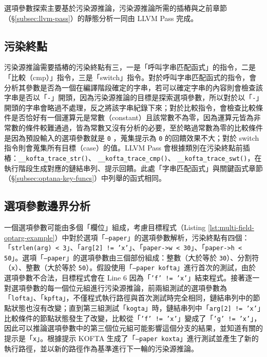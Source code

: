 選項參數探索主要基於污染源推論，污染源推論所需的插樁與之前章節（\S \ref{subsec:llvm-pass}）的靜態分析一同由 LLVM Pass 完成。

\subsection{污染終點}

污染源推論需要插樁的污染終點有三，一是「呼叫字串匹配函式」的指令，二是「比較（cmp）」指令，三是「switch」指令。對於呼叫字串匹配函式的指令，會分析其參數是否為一個在編譯階段確定的字串，若可以確定字串的內容則會檢查該字串是否以「\texttt{-}」開頭，因為污染源推論的目標是探索選項參數，所以對於以「\texttt{-}」開頭的字串會略過不處理，反之將該字串紀錄下來；對於比較指令，會檢查比較條件是否恰好有一個運算元是常數（constant）且該常數不為零，因為運算元皆為非常數的條件較難通過，皆為常數又沒有分析的必要，至於略過常數為零的比較條件是因為預設輸入的選項參數就是 \texttt{0} ，蒐集提示為 \texttt{0} 的回饋效果不大；對於 switch 指令則會蒐集所有目標（case）的值。LLVM Pass 會根據類別在污染終點前插樁：\texttt{\_\_kofta\_trace\_str()}、 \texttt{\_\_kofta\_trace\_cmp()}、  \texttt{\_\_kofta\_trace\_swt()}，在執行階段生成對應的鏈結串列、提示回饋。此處「字串匹配函式」與關鍵函式章節（\S \ref{subsec:optana-key-funcs}）中列舉的函式相同。

\subsection{選項參數邊界分析}

一個選項參數可能由多個「欄位」組成，考慮目標程式（Listing \ref{lst:multi-field-optarg-example}）中對於選項「\texttt{--paper}」的選項參數解析，污染終點有四個：「\texttt{strlen(arg) < 3}」、「\texttt{arg[2] != 'x'}」、「\texttt{paper->w < 30}」、「\texttt{paper->h < 50}」。選項「\texttt{--paper}」的選項參數由三個部份組成：整數（大於等於 \texttt{30}）、分割符（\texttt{x}）、整數（大於等於 \texttt{50}）。假設使用「\texttt{--paper kofta}」進行首次的測試，由於選項參數不合法，目標程式會在 Line 6 因為「\texttt{'f' != 'x'}」結束程式。接著逐一對選項參數的每一個位元組進行污染源推論，前兩組測試的選項參數為「\texttt{lofta}」、「\texttt{kpfta}」，不僅程式執行路徑與首次測試時完全相同，鏈結串列中的節點狀態也沒有改變；直到第三組測試「\texttt{kogta}」時，鏈結串列中「\texttt{arg[2] != 'x'}」比較條件的節點狀態發生了改變，比較從「\texttt{'f' != 'x'}」變成了「\texttt{'g' != 'x'}」，因此可以推論選項參數中的第三個位元組可能影響這個分支的結果，並知道有關的提示是「\texttt{x}」。根據提示 KOFTA 生成了「\texttt{--paper koxta}」進行測試並產生了新的執行路徑，並以新的路徑作為基準進行下一輪的污染源推論。

